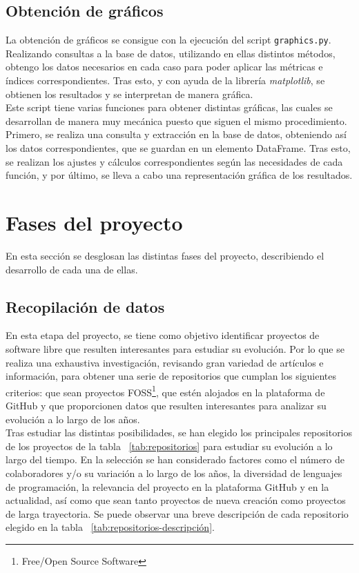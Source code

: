 \documentclass[a4paper, 12pt]{book}
\begin{document}
\subsection{Obtención de gráficos}
\label{subsec:programa-graficos}

La obtención de gráficos se consigue con la ejecución del script \texttt{graphics.py}. Realizando consultas a la base de datos, utilizando en ellas distintos métodos, obtengo los datos necesarios en cada caso para poder aplicar las métricas e índices
correspondientes. Tras esto, y con ayuda de la librería \textit{matplotlib}, se obtienen los resultados y se interpretan de manera gráfica.
\\Este script tiene varias funciones para obtener distintas gráficas, las cuales se desarrollan de manera muy mecánica puesto que siguen el mismo procedimiento. Primero, se realiza una consulta y extracción en la base de datos, obteniendo así los datos
correspondientes, que se guardan en un elemento DataFrame. Tras esto, se realizan los ajustes y cálculos correspondientes según las necesidades de cada función, y por último, se lleva a cabo una representación gráfica de los resultados.

\section{Fases del proyecto} 
\label{sec:fases-proyecto}

En esta sección se desglosan las distintas fases del proyecto, describiendo el desarrollo de cada una de ellas.

\subsection{Recopilación de datos}
\label{subsec:recopilacion}

En esta etapa del proyecto, se tiene como objetivo identificar proyectos de software libre que resulten interesantes para estudiar su evolución. Por lo que se realiza una exhaustiva investigación, revisando gran variedad de artículos e
información, para obtener una serie de repositorios que cumplan los siguientes criterios: que sean proyectos FOSS\footnote{Free/Open Source Software}, que estén alojados en la plataforma de GitHub y que proporcionen datos que resulten interesantes
para analizar su evolución a lo largo de los años.
\\Tras estudiar las distintas posibilidades, se han elegido los principales repositorios de los proyectos de la tabla ~\ref{tab:repositorios} para estudiar su evolución a lo largo del tiempo. En la selección se han considerado factores como el número de colaboradores y/o
su variación a lo largo de los años, la diversidad de lenguajes de programación, la relevancia del proyecto en la plataforma GitHub y en la actualidad, así como que sean tanto proyectos de nueva creación como proyectos de larga trayectoria. Se puede observar una breve descripción
de cada repositorio elegido en la tabla ~\ref{tab:repositorios-descripción}.
\end{document}
